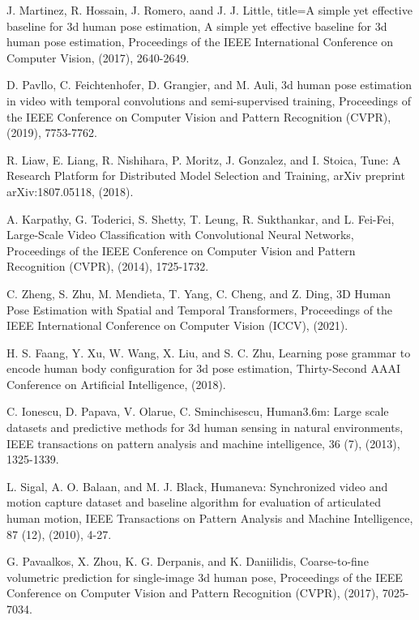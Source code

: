 \documentclass{article}
\begin{document}
\clearpage

\clearpage
\begin{thebibliography}{9}

 J. Martinez, R. Hossain, J. Romero, aand J. J. Little, 
  title={A simple yet effective baseline for 3d human pose estimation}, A simple yet effective baseline for 3d human pose estimation, Proceedings of the IEEE International Conference on Computer Vision, (2017), 2640-2649.


 D. Pavllo, C. Feichtenhofer, D. Grangier, and M. Auli, 3d human pose estimation in video with temporal convolutions and semi-supervised training, Proceedings of the IEEE Conference on Computer Vision and Pattern Recognition (CVPR), (2019), 7753-7762.

R. Liaw, E. Liang, R. Nishihara, P. Moritz, J. Gonzalez, and I. Stoica, Tune: A Research Platform for Distributed Model Selection and Training, arXiv preprint arXiv:1807.05118, (2018).

 A. Karpathy, G. Toderici, S. Shetty, T. Leung, R. Sukthankar, and L. Fei-Fei, Large-Scale Video Classification with Convolutional Neural Networks, Proceedings of the IEEE Conference on Computer Vision and Pattern Recognition (CVPR), (2014), 1725-1732.

 C. Zheng, S. Zhu, M. Mendieta, T. Yang, C. Cheng, and Z. Ding, 3D Human Pose Estimation with Spatial and  Temporal Transformers, Proceedings of the IEEE International Conference on Computer Vision (ICCV), (2021).

 H. S. Faang, Y. Xu, W. Wang, X. Liu, and S. C. Zhu, Learning pose grammar to encode human body configuration for 3d pose estimation, Thirty-Second AAAI Conference on Artificial Intelligence, (2018).

 C. Ionescu, D. Papava, V. Olarue, C. Sminchisescu, Human3.6m: Large scale datasets and predictive methods for 3d human sensing in natural environments, IEEE transactions on pattern analysis and machine intelligence, 36 (7), (2013), 1325-1339.

 L. Sigal, A. O. Balaan, and M. J. Black, Humaneva: Synchronized video and motion capture dataset and baseline algorithm for evaluation of articulated human motion, IEEE Transactions on Pattern Analysis and Machine Intelligence, 87 (12), (2010), 4-27.

 G. Pavaalkos, X. Zhou, K. G. Derpanis, and K. Daniilidis, Coarse-to-fine volumetric prediction for single-image 3d human pose, Proceedings  of the  IEEE Conference on Computer Vision and Pattern Recognition (CVPR), (2017), 7025-7034.


\end{thebibliography}
\end{document}
